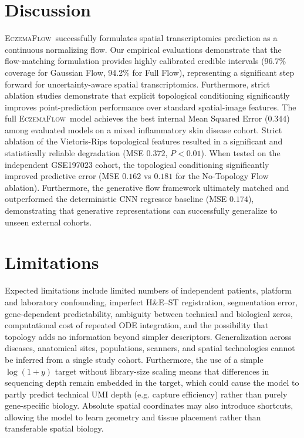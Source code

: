 \documentclass[nocrop]{bioinfo}
\newcommand{\softwarename}{\textsc{EczemaFlow}}
\begin{document}
\section{Discussion}

\softwarename~successfully formulates spatial transcriptomics prediction as a continuous normalizing flow. Our empirical evaluations demonstrate that the flow-matching formulation provides highly calibrated credible intervals (96.7\% coverage for Gaussian Flow, 94.2\% for Full Flow), representing a significant step forward for uncertainty-aware spatial transcriptomics. Furthermore, strict ablation studies demonstrate that explicit topological conditioning significantly improves point-prediction performance over standard spatial-image features. The full \softwarename~model achieves the best internal Mean Squared Error ($0.344$) among evaluated models on a mixed inflammatory skin disease cohort. Strict ablation of the Vietoris-Rips topological features resulted in a significant and statistically reliable degradation (MSE $0.372$, $P < 0.01$). When tested on the independent GSE197023 cohort, the topological conditioning significantly improved predictive error (MSE $0.162$ vs $0.181$ for the No-Topology Flow ablation). Furthermore, the generative flow framework ultimately matched and outperformed the deterministic CNN regressor baseline (MSE $0.174$), demonstrating that generative representations can successfully generalize to unseen external cohorts.

\section{Limitations}

Expected limitations include limited numbers of independent patients,
platform and laboratory confounding, imperfect H\&E--ST registration,
segmentation error, gene-dependent predictability, ambiguity between
technical and biological zeros, computational cost of repeated ODE
integration, and the possibility that topology adds no information beyond
simpler descriptors. Generalization across diseases, anatomical sites,
populations, scanners, and spatial technologies cannot be inferred from a
single study cohort. Furthermore, the use of a simple $\log(1 + y)$ target without library-size scaling means that differences in sequencing depth remain embedded in the target, which could cause the model to partly predict technical UMI depth (e.g. capture efficiency) rather than purely gene-specific biology. Absolute spatial coordinates may also introduce shortcuts, allowing the model to learn geometry and tissue placement rather than transferable spatial biology.
\end{document}
